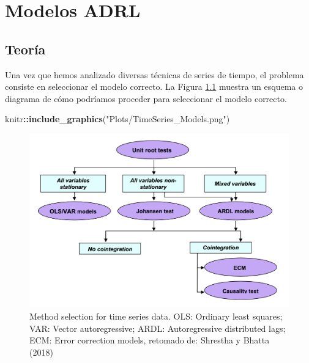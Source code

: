 \documentclass[
]{book}
\newenvironment{Shaded}{\begin{snugshade}}{\end{snugshade}}
\newcommand{\FunctionTok}[1]{\textcolor[rgb]{0.13,0.29,0.53}{\textbf{#1}}}
\newcommand{\NormalTok}[1]{#1}
\newcommand{\SpecialCharTok}[1]{\textcolor[rgb]{0.81,0.36,0.00}{\textbf{#1}}}
\newcommand{\StringTok}[1]{\textcolor[rgb]{0.31,0.60,0.02}{#1}}
\begin{document}
\hypertarget{modelos-adrl}{%
\chapter{Modelos ADRL}\label{modelos-adrl}}

\hypertarget{teoruxeda}{%
\section{Teoría}\label{teoruxeda}}

Una vez que hemos analizado diversas técnicas de series de tiempo, el problema consiste en seleccionar el modelo correcto. La Figura \ref{fig:fig91} muestra un esquema o diagrama de cómo podríamos proceder para seleccionar el modelo correcto.

\begin{Shaded}
\begin{Highlighting}[]
\NormalTok{knitr}\SpecialCharTok{::}\FunctionTok{include\_graphics}\NormalTok{(}\StringTok{"Plots/TimeSeries\_Models.png"}\NormalTok{) }
\end{Highlighting}
\end{Shaded}

\begin{figure}

{\centering \includegraphics[width=0.95\linewidth]{Plots/TimeSeries_Models} 

}

\caption{Method selection for time series data. OLS: Ordinary least squares; VAR: Vector autoregressive; ARDL: Autoregressive distributed lags; ECM: Error correction models, retomado de: Shrestha y Bhatta (2018)}\label{fig:fig91}
\end{figure}
\end{document}
